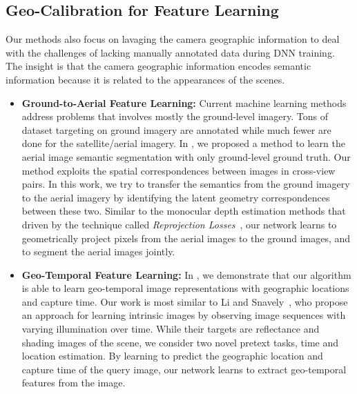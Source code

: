 \subsection{Geo-Calibration for Feature Learning}
Our methods also focus on lavaging the camera geographic information to
deal with the challenges of lacking manually annotated data during DNN
training. The insight is that the camera geographic information
encodes semantic information because it is related to the
appearances of the scenes.

\begin{itemize}[noitemsep]
  \item \textbf{Ground-to-Aerial Feature Learning:}
  Current machine learning methods address problems that involves mostly
  the ground-level imagery. Tons of dataset targeting on ground imagery are
  annotated while much fewer are done for the satellite/aerial imagery. In
  , we proposed a method to learn the aerial image
  semantic segmentation with only ground-level ground truth. Our method
  exploits the spatial correspondences between images in cross-view
  pairs. 
  In this work, we try to transfer the semantics from the ground
  imagery to the aerial imagery by identifying the latent geometry
  correspondences between these two. Similar to the monocular depth
  estimation methods that driven by the technique called {\em
  Reprojection Losses}~\cite{garg2016unsupervised,
  godard2017unsupervised,zhou2017unsupervised, yan2016perspective}, our
  network learns to geometrically project pixels from the aerial
  images to the ground images, and to segment the aerial images
  jointly.
  \newline

  \item \textbf{Geo-Temporal Feature Learning:}
  In , we demonstrate that our algorithm is able to
  learn geo-temporal image representations with geographic locations and
  capture time.
  Our work is most similar to Li and Snavely~\cite{li2018learning},
  who propose an approach for learning intrinsic images by observing
  image sequences with varying illumination over time. While their
  targets are reflectance and shading images of the scene, we consider
  two novel pretext tasks, time and location estimation.
  By learning to predict the geographic location and capture time of
  the query image, our network learns to extract geo-temporal features
  from the image.

\end{itemize}
